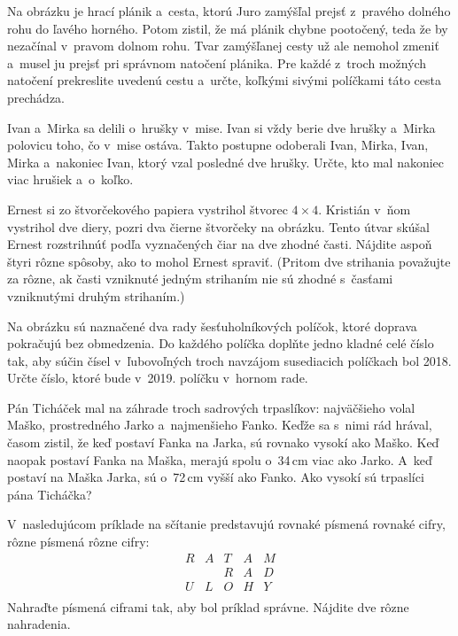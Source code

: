 {%
Na obrázku je hrací plánik a~cesta, ktorú Juro zamýšľal prejsť z~pravého dolného rohu do ľavého horného. Potom zistil, že má plánik chybne pootočený, teda že by nezačínal v~pravom dolnom rohu. Tvar zamýšľanej cesty už ale nemohol zmeniť a~musel ju prejsť pri správnom natočení plánika. Pre každé z~troch možných natočení prekreslite uvedenú cestu a~určte, koľkými sivými políčkami táto cesta prechádza.
%
}

{%
Ivan a~Mirka sa delili o~hrušky v~mise. Ivan si vždy berie dve hrušky a~Mirka polovicu toho, čo v~mise ostáva. Takto postupne odoberali Ivan, Mirka, Ivan, Mirka a~nakoniec Ivan, ktorý vzal posledné dve hrušky. Určte, kto mal nakoniec viac hrušiek a~o~koľko.}

{%
Ernest si zo štvorčekového papiera vystrihol štvorec $4\times 4$. Kristián v~ňom vystrihol dve diery, pozri dva čierne štvorčeky na obrázku. Tento útvar skúšal Ernest rozstrihnúť podľa vyznačených čiar na dve zhodné časti. Nájdite aspoň štyri rôzne spôsoby, ako to mohol Ernest spraviť. (Pritom dve strihania považujte za rôzne, ak časti vzniknuté jedným strihaním nie sú zhodné s~časťami vzniknutými druhým strihaním.)
%
}

{%
Na obrázku sú naznačené dva rady šesťuholníkových políčok, ktoré doprava pokračujú bez obmedzenia. Do každého políčka doplňte jedno kladné celé číslo tak, aby súčin čísel v~ľubovoľných troch navzájom susediacich políčkach bol 2018. Určte číslo, ktoré bude v~2019. políčku v~hornom rade.
%
}

{%
Pán Ticháček mal na záhrade troch sadrových trpaslíkov: najväčšieho volal Maško, prostredného Jarko a~najmenšieho Fanko. Keďže sa s~nimi rád hrával, časom zistil, že keď postaví Fanka na Jarka, sú rovnako vysokí ako Maško. Keď naopak postaví Fanka na Maška, merajú spolu o~34\,cm viac ako Jarko. A~keď postaví na Maška Jarka, sú o~72\,cm vyšší ako Fanko. Ako vysokí sú trpaslíci pána Ticháčka?}

{%
V~nasledujúcom príklade na sčítanie predstavujú rovnaké písmená rovnaké cifry, rôzne písmená rôzne cifry:
$$
\begin{array}{ccccc}
R & A & T & A & M \\
 & & R & A & D \\
\hline
U & L & O & H & Y \\
\end{array}
$$
Nahraďte písmená ciframi tak, aby bol príklad správne. Nájdite dve rôzne nahradenia.}

